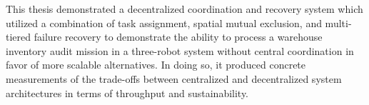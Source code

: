 \vspace*{0.3cm}
\noindent
This thesis demonstrated a decentralized coordination and recovery system which utilized a combination of task assignment, spatial mutual exclusion, and multi-tiered failure recovery to demonstrate the ability to process a warehouse inventory audit mission in a three-robot system without central coordination in favor of more scalable alternatives. In doing so, it produced concrete measurements of the trade-offs between centralized and decentralized system architectures in terms of throughput and sustainability.
